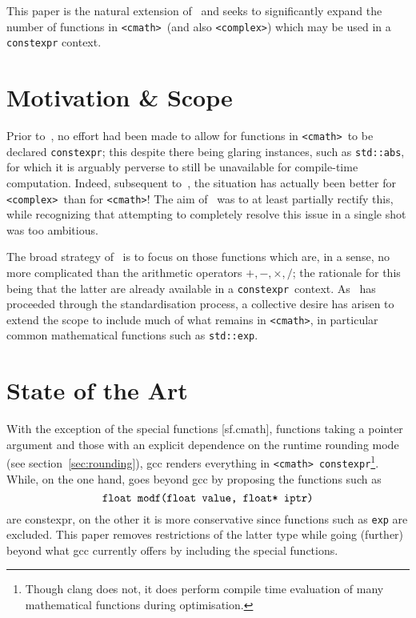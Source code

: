 \documentclass[prd,twocolumn,amsmath,amssymb,nofootinbib,eqsecnum]{revtex4-1}
\newcommand{\constexpr}{\code{constexpr}\xspace}
\newcommand{\code}[1]{{\tt #1}}
\newcommand{\header}[1]{{\tt <#1>}}
\newcommand{\cmath}{\header{cmath}}
\newcommand{\complex}{\header{complex}}
\newcommand{\Operators}{\ensuremath{+,-,\times,/}}
\begin{document}
This paper is the natural extension of~\cite{Rosten-constexpr} and seeks to significantly expand the number of functions in \cmath\ (and also \complex) which may be used in a \constexpr context. 


\section{Motivation \& Scope}

Prior to~\cite{Rosten-constexpr}, no effort had been made to allow for functions in \cmath\ to be declared \constexpr; this despite there being glaring instances, such as \code{std::abs}, for which it is arguably perverse to still be unavailable for compile-time computation. Indeed, subsequent to~\cite{AP-complex}, the situation has actually been better for \complex\ than for \cmath! The aim of~\cite{Rosten-constexpr} was to at least partially rectify this, while recognizing that attempting to completely resolve this issue in a single shot was too ambitious.

The broad strategy of~\cite{Rosten-constexpr} is to focus on those functions which are, in a sense, no more complicated than the arithmetic operators \Operators; the rationale for this being that the latter are already available in a \constexpr\ context.
As~\cite{Rosten-constexpr} has proceeded through the standardisation process, a collective desire has arisen to extend the scope to include much of what remains in \cmath, in particular common mathematical functions such as \code{std::exp}.


\section{State of the Art}

With the exception of the special functions [sf.cmath], functions taking a pointer argument and those with an explicit dependence on the runtime rounding mode (see section~\ref{sec:rounding}), gcc renders everything in \cmath\ \constexpr\footnote{Though clang does not, it does perform compile time evaluation of many mathematical functions during optimisation.
}. While, on the one hand, \cite{Rosten-constexpr} goes beyond gcc by proposing the functions such as
\[
	\mbox{\code{float modf(float value, float* iptr)}}
\]
are constexpr, on the other it is more conservative since functions such as \code{exp} are excluded. This paper removes restrictions of the latter type while going (further) beyond what gcc currently offers by including the special functions.
\end{document}
